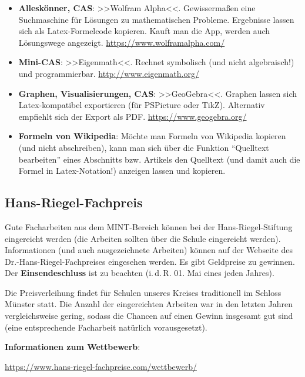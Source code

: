 \documentclass[11pt, a4paper, oneside, openright]{article}
\newcommand \idR{i.\,d.\,R.\xspace }
\newcommand \bzw{bzw.\xspace }
\begin{document}
\begin{itemize}
    \item \textbf{Alleskönner, CAS}: >>Wolfram Alpha<<. Gewissermaßen eine Suchmaschine für Lösungen zu mathematischen Probleme. Ergebnisse lassen sich als Latex-Formelcode kopieren. Kauft man die App, werden auch Lösungswege angezeigt. \url{https://www.wolframalpha.com/}

    \item \textbf{Mini-CAS}: >>Eigenmath<<. Rechnet symbolisch (und nicht algebraisch!) und programmierbar. \url{http://www.eigenmath.org/}

    \item \textbf{Graphen, Visualisierungen, CAS}: >>GeoGebra<<. Graphen lassen sich Latex-kompatibel exportieren (für PSPicture oder TikZ). Alternativ empfiehlt sich der Export als PDF. \url{https://www.geogebra.org/}

    \item \textbf{Formeln von Wikipedia}: Möchte man Formeln von Wikipedia kopieren (und nicht abschreiben), kann man sich über die Funktion \enquote{Quelltext bearbeiten} eines Abschnitts \bzw Artikels den Quelltext (und damit auch die Formel in Latex-Notation!) anzeigen lassen und kopieren.
\end{itemize}





\subsection{Hans-Riegel-Fachpreis}
\label{sec:hrfp}
Gute Facharbeiten aus dem MINT-Bereich können bei der Hans-Riegel-Stiftung eingereicht werden (die Arbeiten sollten über die Schule eingereicht werden). Informationen (und auch ausgezeichnete Arbeiten) können auf der Webseite des Dr.-Hans-Riegel-Fachpreises eingesehen werden. Es gibt Geldpreise zu gewinnen. Der \textbf{Einsendeschluss} ist zu beachten (\idR 01. Mai eines jeden Jahres).

Die Preisverleihung findet für Schulen unseres Kreises traditionell im Schloss Münster statt. Die Anzahl der eingereichten Arbeiten war in den letzten Jahren vergleichsweise gering, sodass die Chancen auf einen Gewinn insgesamt gut sind (eine entsprechende Facharbeit natürlich vorausgesetzt).

\vspace{2em}

\noindent
\textbf{Informationen zum Wettbewerb}: 
\begin{center}
    \url{https://www.hans-riegel-fachpreise.com/wettbewerb/}
\end{center}
\end{document}
